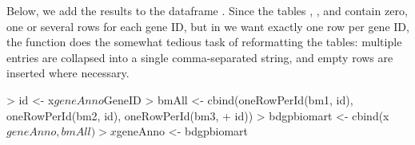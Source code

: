 %
Below, we add the results
to the dataframe . Since the tables ,
, and  contain zero, one or several rows for
each gene ID, but in  we want exactly one row per
gene ID, the function  does the somewhat tedious
task of reformatting the tables: multiple entries are collapsed
into a single comma-separated string, and empty rows are inserted
where necessary.
%
\begin{Schunk}
\begin{Sinput}
> id <- x$geneAnno$GeneID
> bmAll <- cbind(oneRowPerId(bm1, id), oneRowPerId(bm2, id), oneRowPerId(bm3, 
+     id))
> bdgpbiomart <- cbind(x$geneAnno, bmAll)
> x$geneAnno <- bdgpbiomart
\end{Sinput}
\end{Schunk}


